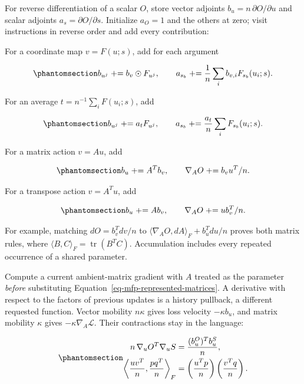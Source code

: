 \documentclass[
  11pt,
]{article}
\theoremstyle{definition}
\theoremstyle{plain}
\theoremstyle{plain}
\theoremstyle{plain}
\theoremstyle{remark}
\begin{document}
For reverse differentiation of a scalar \(O\), store vector adjoints
\(b_u=n\,\partial O/\partial u\) and scalar adjoints
\(a_s=\partial O/\partial s\). Initialize \(a_O=1\) and the others at
zero; visit instructions in reverse order and add every contribution:

For a coordinate map \(v=F(u;s)\), add for each argument

\begin{equation}\protect\phantomsection\label{eq-mfp-coordinate-adjoint}{
b_{u^j}\mathrel{+}=b_v\odot F_{u^j},\qquad
a_{s_b}\mathrel{+}=\frac1n\sum_i b_{v,i}F_{s_b}(u_i;s).
}\end{equation}

For an average \(t=n^{-1}\sum_iF(u_i;s)\), add

\begin{equation}\protect\phantomsection\label{eq-mfp-average-adjoint}{
b_{u^j}\mathrel{+}=a_tF_{u^j},\qquad
a_{s_b}\mathrel{+}=\frac{a_t}{n}\sum_iF_{s_b}(u_i;s).
}\end{equation}

For a matrix action \(v=Au\), add

\begin{equation}\protect\phantomsection\label{eq-mfp-matrix-adjoint}{
b_u\mathrel{+}=A^Tb_v,\qquad \nabla_AO\mathrel{+}=b_vu^T/n.
}\end{equation}

For a transpose action \(v=A^Tu\), add

\begin{equation}\protect\phantomsection\label{eq-mfp-transpose-adjoint}{
b_u\mathrel{+}=Ab_v,\qquad \nabla_AO\mathrel{+}=ub_v^T/n.
}\end{equation}

For example, matching \(dO=b_v^Tdv/n\) to
\(\langle\nabla_AO,dA\rangle_F+b_u^Tdu/n\) proves both matrix rules,
where \(\langle B,C\rangle_F=\operatorname{tr}(B^TC)\). Accumulation
includes every repeated occurrence of a shared parameter.

Compute a current ambient-matrix gradient with \(A\) treated as the
parameter \emph{before} substituting
Equation~\ref{eq-mfp-represented-matrices}. A derivative with respect to
the factors of previous updates is a history pullback, a different
requested function. Vector mobility \(n\kappa\) gives loss velocity
\(-\kappa b_u\), and matrix mobility \(\kappa\) gives
\(-\kappa\nabla_A\mathcal L\). Their contractions stay in the language:

\begin{equation}\protect\phantomsection\label{eq-mfp-gradient-contractions}{
\begin{aligned}
n\,\nabla_uO^T\nabla_uS
&=\frac{(b_u^O)^Tb_u^S}{n},\\
\left\langle\frac{uv^T}{n},\frac{pq^T}{n}\right\rangle_F
&=\left(\frac{u^Tp}{n}\right)\left(\frac{v^Tq}{n}\right).
\end{aligned}
}\end{equation}
\end{document}
